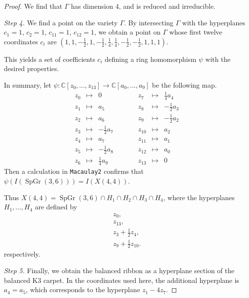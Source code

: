 \documentclass{amsart}[12pt]
\theoremstyle{definition}
\numberwithin{equation}{section}
\newcommand{\SpGr}{\operatorname{SpGr}(3,6)}
\newcommand{\AffX}{\Gamma}
\begin{document}
\begin{proof}
We find that $\AffX$ has dimension 4, and is reduced and irreducible.

\textit{Step 4.} We find a point on the variety $\AffX$. By intersecting $\AffX$ with the hyperplanes $c_1 = 1$, $c_2 = 1$, $c_{11}=1$, $c_{12}=1$, we obtain a point on $\AffX$ whose first twelve coordinates $c_i$ are   $(1, 1, -\frac{1}{2}, 1, -\frac{1}{2}, \frac{1}{4}, \frac{1}{4}, -\frac{1}{2}, -\frac{1}{2}, 1, 1, 1)$. 

This yields a set of coefficients $c_i$ defining a ring homomorphism $\psi$ with
the desired properties.



In summary, let $\psi: \mathbb{C}[z_0,\ldots,z_{13}] \rightarrow \mathbb{C}[a_0,\ldots,a_9] $ be the following map.
 \begin{equation}
 \begin{array}{lcrclcr}
z_0 &\mapsto &  0   & \qquad & z_7 &\mapsto &\frac{1}{4}a_4\\
z_1 &\mapsto & a_5 && z_8 &\mapsto  &-\frac{1}{2} a_3\\
z_2 &\mapsto & a_6 && z_9 &\mapsto  & -\frac{1}{2} a_2\\
z_3 &\mapsto & -\frac{1}{2} a_7 && z_{10} &\mapsto &a_2\\
z_4 &\mapsto & a_7 && z_{11} &\mapsto & a_1\\
z_5 &\mapsto & -\frac{1}{2} a_8 && z_{12} &\mapsto & a_0\\
z_6 &\mapsto & \frac{1}{4} a_9 && z_{13} &\mapsto & 0
 \end{array}
\end{equation}
 Then a calculation in \texttt{Macaulay2} confirms that $\psi(I(\SpGr)) = I(X(4,4))$.


 Thus $X(4,4) = \SpGr \cap H_1 \cap H_2 \cap H_3 \cap H_4$, where the hyperplanes $H_1,\ldots,H_4$ are defined by
 \begin{gather*}
   z_0,\\
   z_{13},\\
   z_3+\frac{1}{2}z_4,\\
  z_9+\frac{1}{2}z_{10}.
 \end{gather*}
 respectively.

 \textit{Step 5.} Finally, we obtain the balanced ribbon as a hyperplane section of the balanced K3 carpet. In the coordinates used here, the additional hyperplane is $a_4=a_5$, which corresponds to the hyperplane $z_1-4z_7$.
\end{proof}
\end{document}
